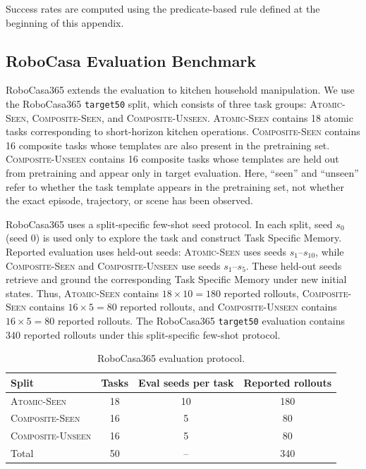 \documentclass[11pt]{article}
\begin{document}
Success rates are computed using the predicate-based rule defined at the beginning of this appendix.

\subsection{RoboCasa Evaluation Benchmark}
\label{app:benchmark:robocasa}

RoboCasa365 extends the evaluation to kitchen household manipulation. We use the RoboCasa365 \texttt{target50} split, which consists of three task groups: \textsc{Atomic-Seen}, \textsc{Composite-Seen}, and \textsc{Composite-Unseen}. \textsc{Atomic-Seen} contains 18 atomic tasks corresponding to short-horizon kitchen operations. \textsc{Composite-Seen} contains 16 composite tasks whose templates are also present in the pretraining set. \textsc{Composite-Unseen} contains 16 composite tasks whose templates are held out from pretraining and appear only in target evaluation. Here, ``seen'' and ``unseen'' refer to whether the task template appears in the pretraining set, not whether the exact episode, trajectory, or scene has been observed.

RoboCasa365 uses a split-specific few-shot seed protocol. In each split, seed $s_0$ (seed 0) is used only to explore the task and construct Task Specific Memory. Reported evaluation uses held-out seeds: \textsc{Atomic-Seen} uses seeds $s_1$--$s_{10}$, while \textsc{Composite-Seen} and \textsc{Composite-Unseen} use seeds $s_1$--$s_5$. These held-out seeds retrieve and ground the corresponding Task Specific Memory under new initial states. Thus, \textsc{Atomic-Seen} contains $18 \times 10 = 180$ reported rollouts, \textsc{Composite-Seen} contains $16 \times 5 = 80$ reported rollouts, and \textsc{Composite-Unseen} contains $16 \times 5 = 80$ reported rollouts. The RoboCasa365 \texttt{target50} evaluation contains 340 reported rollouts under this split-specific few-shot protocol.

\begin{table}[h]
    \centering
    \caption{RoboCasa365 evaluation protocol.}
    \label{tab:app_robocasa_protocol}
    \begin{tabular}{lccc}
        \toprule
        Split & Tasks & Eval seeds per task & Reported rollouts \\
        \midrule
        \textsc{Atomic-Seen}      & 18 & 10 & 180 \\
        \textsc{Composite-Seen}   & 16 & 5 & 80 \\
        \textsc{Composite-Unseen} & 16 & 5 & 80 \\
        \midrule
        Total & 50 & -- & 340 \\
        \bottomrule
    \end{tabular}
\end{table}
\end{document}
